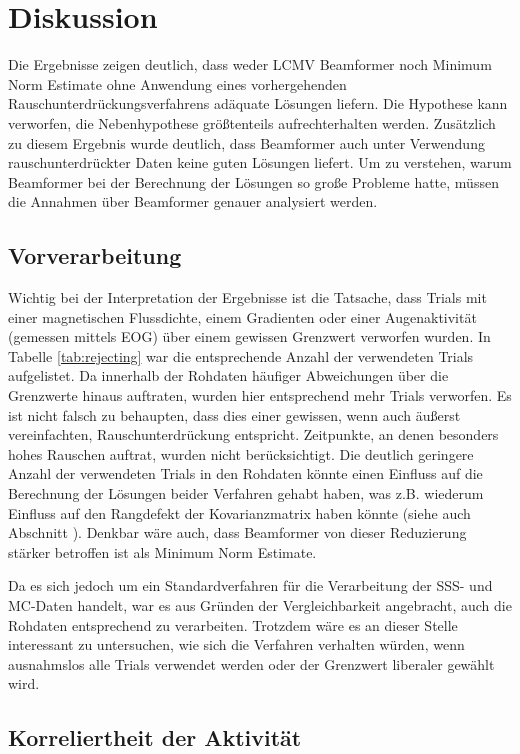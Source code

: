\documentclass[doc,a4paper,12pt]{apa6}
\makeatletter
\DeclareRobustCommand*{\nameref}[1]{%
      \glqq{\myorg@nameref{#1}}\grqq%
    }%
\makeatother
\begin{document}
\section{Diskussion}
\label{sec:diskussion}

Die Ergebnisse zeigen deutlich, dass weder LCMV Beamformer noch Minimum Norm Estimate ohne Anwendung eines vorhergehenden Rauschunterdrückungsverfahrens adäquate Lösungen liefern. Die Hypothese kann verworfen, die Nebenhypothese größtenteils aufrechterhalten werden. Zusätzlich zu diesem Ergebnis wurde deutlich, dass Beamformer auch unter Verwendung rauschunterdrückter Daten keine guten Lösungen liefert. Um zu verstehen, warum Beamformer bei der Berechnung der Lösungen so große Probleme hatte, müssen die Annahmen über Beamformer genauer analysiert werden.

\subsection{Vorverarbeitung}

Wichtig bei der Interpretation der Ergebnisse ist die Tatsache, dass Trials mit einer magnetischen Flussdichte, einem Gradienten oder einer Augenaktivität (gemessen mittels EOG) über einem gewissen Grenzwert verworfen wurden. In Tabelle \ref{tab:rejecting} war die entsprechende Anzahl der verwendeten Trials aufgelistet. Da innerhalb der Rohdaten häufiger Abweichungen über die Grenzwerte hinaus auftraten, wurden hier entsprechend mehr Trials verworfen. Es ist nicht falsch zu behaupten, dass dies einer gewissen, wenn auch äußerst vereinfachten, Rauschunterdrückung entspricht. Zeitpunkte, an denen besonders hohes Rauschen auftrat, wurden nicht berücksichtigt. Die deutlich geringere Anzahl der verwendeten Trials in den Rohdaten könnte einen Einfluss auf die Berechnung der Lösungen beider Verfahren gehabt haben, was z.B. wiederum Einfluss auf den Rangdefekt der Kovarianzmatrix haben könnte (siehe auch Abschnitt \nameref{sec:regu-kov}). Denkbar wäre auch, dass Beamformer von dieser Reduzierung stärker betroffen ist als Minimum Norm Estimate.

Da es sich jedoch um ein Standardverfahren für die Verarbeitung der SSS- und MC-Daten handelt, war es aus Gründen der Vergleichbarkeit angebracht, auch die Rohdaten entsprechend zu verarbeiten. Trotzdem wäre es an dieser Stelle interessant zu untersuchen, wie sich die Verfahren verhalten würden, wenn ausnahmslos alle Trials verwendet werden oder der Grenzwert liberaler gewählt wird.

\subsection{Korreliertheit der Aktivität}
\end{document}

